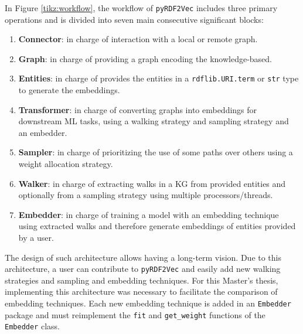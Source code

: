 In Figure \ref{tikz:workflow}, the workflow of \texttt{pyRDF2Vec} includes three
primary operations and is divided into seven main consecutive significant
blocks:
\begin{multicols}{2}
\begin{enumerate}
\item \textbf{Connector}: in charge of interaction with a local or remote graph.
\item \textbf{Graph}: in charge of providing a graph encoding the knowledge-based.
\item \textbf{Entities}: in charge of provides the entities in a
\texttt{rdflib.URI.term} or \texttt{str} type to generate the embeddings.
\item \textbf{Transformer}: in charge of converting graphs into embeddings for
downstream ML tasks, using a walking strategy and sampling strategy and an
embedder.
\item \textbf{Sampler}: in charge of prioritizing the use of some paths over
others using a weight allocation strategy.
\item \textbf{Walker}: in charge of extracting walks in a KG from provided
entities and optionally from a sampling strategy using multiple
processors/threads.
\item \textbf{Embedder}: in charge of training a model with an embedding
technique using extracted walks and therefore generate embeddings of entities
provided by a user.
\end{enumerate}
\end{multicols}

The design of such architecture allows having a long-term vision. Due to this
architecture, a user can contribute to \texttt{pyRDF2Vec} and easily add new
walking strategies and sampling and embedding techniques. For this Master’s
thesis, implementing this architecture was necessary to facilitate the
comparison of embedding techniques. Each new embedding technique is added in an
\texttt{Embedder} package and must reimplement the \texttt{fit} and
\texttt{get\_weight} functions of the \texttt{Embedder} class.

